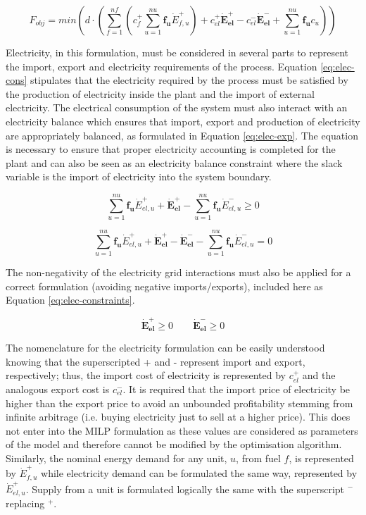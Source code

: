 \begin{equation}\label{eq:HC_obj}
F_{obj} = min (d \cdot (\sum_{f=1}^{nf} (c_{f}^+  \sum_{u=1}^{nu} \boldsymbol{f_u} \dot{E}_{f,u}^+) + c_{el}^{+} \boldsymbol{\dot{E}_{el}^+} - c_{el}^{-} \boldsymbol{\dot{E}_{el}^-} +  \sum_{u=1}^{nu} \boldsymbol {f_u} c_{u} )) 
\end{equation}

Electricity, in this formulation, must be considered in several parts to represent the import, export and electricity requirements of the process. Equation \ref{eq:elec-cons} stipulates that the electricity required by the process must be satisfied by the production of electricity inside the plant and the import of external electricity. The electrical consumption of the system must also interact with an electricity balance which ensures that import, export and production of electricity are appropriately balanced, as formulated in Equation \ref{eq:elec-exp}. The equation is necessary to ensure that proper electricity accounting is completed for the plant and can also be seen as an electricity balance constraint where the slack variable is the import of electricity into the system boundary.
   
\begin{equation}\label{eq:elec-cons}
\sum_{u=1}^{nu} \boldsymbol {f_{u}} \dot{E}_{el,u}^+ + \boldsymbol {\dot{E}_{el}^+} - \sum_{u=1}^{nu} \boldsymbol {f_{u}} \dot{E}_{el,u}^- \geq 0
\end{equation}

\begin{equation}
\label{eq:elec-exp}
\sum_{u=1}^{nu} \boldsymbol {f_{u}} \dot{E}_{el,u}^+ + \boldsymbol {\dot{E}_{el}^+} - \boldsymbol {\dot{E}_{el}^-} - \sum_{u=1}^{nu} \boldsymbol {f_{u}} \dot{E}_{el,u}^- = 0
\end{equation}

The non-negativity of the electricity grid interactions must also be applied for a correct formulation (avoiding negative imports/exports), included here as Equation \ref{eq:elec-constraints}.

\begin{equation}
\label{eq:elec-constraints}
\boldsymbol {\dot{E}_{el}^+}  \geq 0 ~~~~~~~~~ \boldsymbol {\dot{E}_{el}^-} \geq 0
\end{equation}

The nomenclature for the electricity formulation can be easily understood knowing that the superscripted + and - represent import and export, respectively; thus, the import cost of electricity is represented by $c_{el}^+$ and the analogous export cost is $c_{el}^-$. It is required that the import price of electricity be higher than the export price to avoid an unbounded profitability stemming from infinite arbitrage (i.e. buying electricity just to sell at a higher price). This does not enter into the MILP formulation as these values are considered as parameters of the model and therefore cannot be modified by the optimisation algorithm. Similarly, the nominal energy demand for any unit, $u$, from fuel $f$, is represented by $\dot{E}_{f,u}^+$ while electricity demand can be formulated the same way, represented by $\dot{E}_{el,u}^+$. Supply from a unit is formulated logically the same with the superscript $^-$ replacing $^+$.

